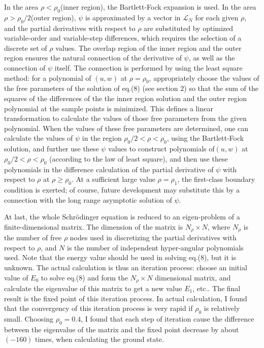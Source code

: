 In the area $\rho<\rho_{0}$(inner region), the Bartlett-Fock expansion is used.
In the area $\rho>\rho_{0}/2$(outer region), $\psi$ is approximated
by a vector in $\mathcal{L}_N$ for each given $\rho$, and the partial
derivatives with respect to $\rho$ are substituted by optimized
variable-order and variable-step differences, which requires the selection
of a discrete set of $\rho$ values.
The overlap region of the inner region and the
outer region ensures the natural connection of the derivative of $\psi$,
as well as the connection of $\psi$ itself. The connection is performed
by using the least square method:
for a polynomial of $(u,w)$ at $\rho=\rho_{0}$, appropriately
choose the values of the free parameters of the solution of eq.(8)
(see section 2) so that the sum of the squares of the differences of the
the inner region solution and the outer region polynomial at the sample points
is minimized. This defines a linear transformation to calculate the values
of those free parameters from the given polynomial. When the values
of these free parameters are determined, one can calculate the values
of $\psi$ in the region $\rho_{0}/2<\rho<\rho_{0}$, using the Bartlett-Fock
solution, and further use these $\psi$ values to construct polynomials
of$(u,w)$ at $\rho_{0}/2<\rho<\rho_{0}$ (according to the law of
least square), and then use these polynomials
in the difference calculation of the partial derivative of $\psi$ with
respect to $\rho$ at $\rho\ge\rho_{0}$. At a sufficient large value
$\rho=\rho_{1}$, the first-class boundary condition is exerted; of course,
future development may substitute this by a connection with the long range
asymptotic solution of $\psi$.

At last, the whole Schr\"{o}dinger equation is reduced to an eigen-problem
of a finite-dimensional matrix. The dimension of the matrix is
$N_{\rho}\times N$, where $N_{\rho}$ is the number of free 
$\rho$ nodes
used in discretizing the partial derivatives with respect to $\rho$, and $N$
is the number of independent hyper-angular polynomials used. Note that
the energy value should be used in solving eq.(8), but it is unknown. The
actual calculation is thus an iteration process: choose an initial value
of $E_0$ to solve eq.(8) and form the $N_{\rho}\times N$ dimensional matrix,
and calculate the eigenvalue of this matrix to get a new value $E_1$, etc..
The final result is the fixed point of this iteration process. In actual
calculation, I found that the convergency of this iteration process
is very rapid if $\rho_0$ is relatively small. Choosing $\rho_{0}=0.4$,
I found that each step of iteration cause the difference between the eigenvalue
of the matrix and the fixed point decrease by about $(-160)$ times, when
calculating the ground state.

